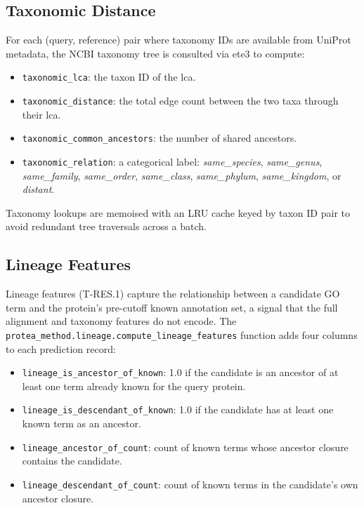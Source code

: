 \subsection{Taxonomic Distance}
\label{subsec:fe-taxonomy}

For each (query, reference) pair where taxonomy IDs are available from UniProt
metadata, the NCBI taxonomy tree is consulted via ete3 to compute:

\begin{itemize}
  \item \texttt{taxonomic\_lca}: the taxon ID of the \gls{lca}.
  \item \texttt{taxonomic\_distance}: the total edge count between the two taxa
    through their \gls{lca}.
  \item \texttt{taxonomic\_common\_ancestors}: the number of shared ancestors.
  \item \texttt{taxonomic\_relation}: a categorical label:
    \textit{same\_species}, \textit{same\_genus}, \textit{same\_family},
    \textit{same\_order}, \textit{same\_class}, \textit{same\_phylum},
    \textit{same\_kingdom}, or \textit{distant}.
\end{itemize}

Taxonomy lookups are memoised with an LRU cache keyed by taxon ID pair to avoid
redundant tree traversals across a batch.

\subsection{Lineage Features}
\label{subsec:fe-lineage}

Lineage features (T-RES.1) capture the relationship between a candidate GO
term and the protein's pre-cutoff known annotation set, a signal that the full
alignment and taxonomy features do not encode. The
\texttt{protea\_method.lineage.compute\_lineage\_features} function adds four
columns to each prediction record:

\begin{itemize}
  \item \texttt{lineage\_is\_ancestor\_of\_known}: 1.0 if the candidate is an
    ancestor of at least one term already known for the query protein.
  \item \texttt{lineage\_is\_descendant\_of\_known}: 1.0 if the candidate has
    at least one known term as an ancestor.
  \item \texttt{lineage\_ancestor\_of\_count}: count of known terms whose
    ancestor closure contains the candidate.
  \item \texttt{lineage\_descendant\_of\_count}: count of known terms in the
    candidate's own ancestor closure.
\end{itemize}

